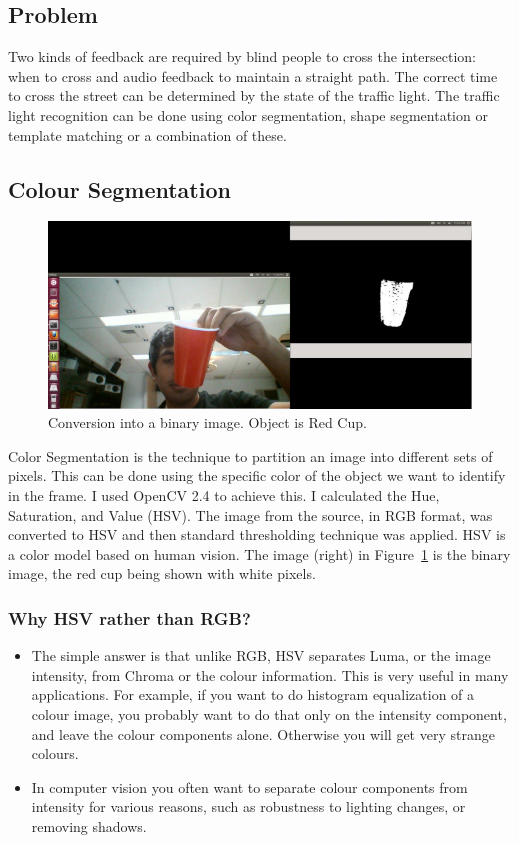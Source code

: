 \subsection{Problem}
Two kinds of feedback are required by blind people to cross the intersection: when to cross and audio feedback to maintain a straight path. The correct time to cross the street can be determined by the state of the traffic light. The traffic light recognition can be done using color segmentation, shape segmentation or template matching or a combination of these. 

\subsection{Colour Segmentation}
\begin{figure}
\begin{center}
\includegraphics[scale=0.5]{binary.png}
\caption{Conversion into a binary image. Object is Red Cup.}
\label{fig:binary}
\end{center}
\end{figure}
Color Segmentation is the technique to partition an image into different sets of pixels. This can be done using the specific color of the object we want to identify in the frame. I used OpenCV 2.4 to achieve this. I calculated the Hue, Saturation, and Value (HSV). The image from the source, in RGB format, was converted to HSV and then standard thresholding technique was applied. HSV is a color model based on human vision. The image (right) in Figure~\ref{fig:binary} is the binary image, the red cup being shown with white pixels.
 
\subsubsection{Why HSV rather than RGB?}


\begin{itemize}
	\item The simple answer is that unlike RGB, HSV separates Luma, or the image intensity, from Chroma or the colour information. This is very useful in many applications. For example, if you want to do histogram equalization of a colour image, you probably want to do that only on the intensity component, and leave the colour components alone. Otherwise you will get very strange colours.
	\item In computer vision you often want to separate colour components from intensity for various reasons, such as robustness to lighting changes, or removing shadows.
	
\end{itemize}

